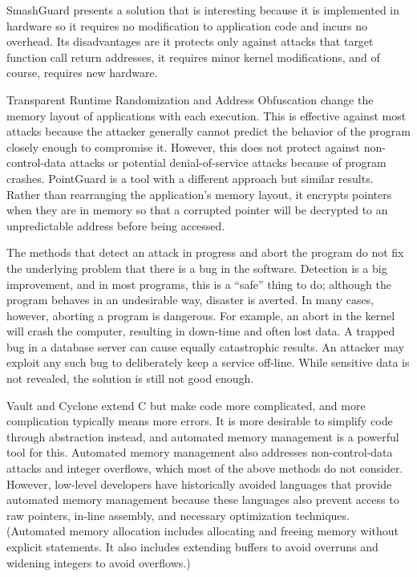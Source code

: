 SmashGuard\cite{2003ozdog} presents a solution that is interesting because it is implemented in hardware so it requires
no modification to application code and incurs no overhead.  Its disadvantages are it protects only against attacks that
target function call return addresses, it requires minor kernel modifications, and of course, requires new hardware.

Transparent Runtime Randomization\cite{2003xu} and Address Obfuscation\cite{2003bhatkar} change the memory layout of
applications with each execution.  This is effective against most attacks because the attacker generally cannot predict
the behavior of the program closely enough to compromise it.  However, this does not protect against non-control-data
attacks or potential denial-of-service attacks because of program crashes.  PointGuard\cite{2003cowan} is a tool with a
different approach but similar results.  Rather than rearranging the application's memory layout, it encrypts pointers
when they are in memory so that a corrupted pointer will be decrypted to an unpredictable address before being
accessed.

The methods that detect an attack in progress and abort the program do not fix the underlying problem that there is a
bug in the software.  Detection is a big improvement, and in most programs, this is a ``safe'' thing to do; although the
program behaves in an undesirable way, disaster is averted.  In many cases, however, aborting a program is dangerous.
For example, an abort in the kernel will crash the computer, resulting in down-time and often lost data.  A trapped bug
in a database server can cause equally catastrophic results.  An attacker may exploit any such bug to deliberately keep
a service off-line.  While sensitive data is not revealed, the solution is still not good enough.

Vault and Cyclone extend C but make code more complicated, and more complication typically means more errors.  It is
more desirable to simplify code through abstraction instead, and automated memory management is a powerful tool for
this.  Automated memory management also addresses non-control-data attacks and integer overflows, which most of the above methods do
not consider.  However, low-level developers have historically avoided languages that provide automated memory management
because these languages also prevent access to raw pointers, in-line assembly, and necessary optimization techniques.
(Automated memory allocation includes allocating and freeing memory without explicit statements.  It also includes
extending buffers to avoid overruns and widening integers to avoid overflows.)

